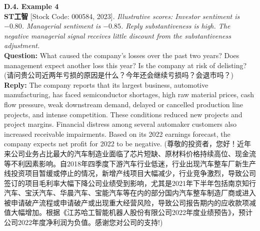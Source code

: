 \noindent \textbf{D.4. Example 4} \\
\textbf{ST工智} [Stock Code: 000584, 2023]. \textit{Illustrative scores: Investor sentiment is $-0.80$. Managerial sentiment is $-0.85$. Reply substantiveness is high. The negative managerial signal receives little discount from the substantiveness adjustment.} \\
\textbf{Question:} What caused the company's losses over the past two years? Does management expect another loss this year? Is the company at risk of delisting? (请问贵公司近两年亏损的原因是什么？今年还会继续亏损吗？会退市吗？) \\
\textbf{Reply:} The company reports that its largest business, automotive manufacturing, has faced semiconductor shortages, high raw material prices, cash flow pressure, weak downstream demand, delayed or cancelled production line projects, and intense competition. These conditions reduced new projects and project margins. Financial distress among several automaker customers also increased receivable impairments. Based on its 2022 earnings forecast, the company expects net profit for 2022 to be negative. (尊敬的投资者，您好！近年来公司业务占比最大的汽车制造业面临了芯片短缺、原材料价格持续高位、现金流等不利因素影响。自2018年四季度下游汽车行业低迷，行业出现汽车整车厂新生产线投资项目暂缓或停止的情况，新增产线项目大幅减少，行业竞争激烈，导致公司签订的项目毛利率大幅下降公司业绩受到影响，尤其是2021年下半年包括南京知行汽车、宝沃汽车、华晨汽车、宝能汽车等在内的部分国内汽车整车制造厂商或进入被申请破产流程或申请破产或出现重大经营风险，导致公司报告期内的应收款项减值大幅增加。根据《江苏哈工智能机器人股份有限公司2022年度业绩预告》，预计公司2022年度净利润为负值。感谢您对公司的支持!)
